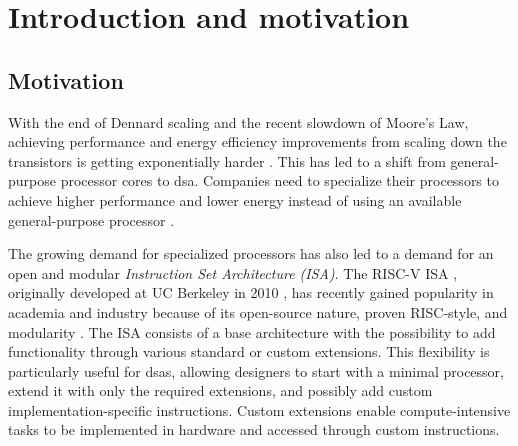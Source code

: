 
\chapter{Introduction and motivation}
\label{Introduction} 





\section{Motivation}


With the end of Dennard scaling and the recent slowdown of Moore's Law, achieving performance and energy efficiency improvements from scaling down the transistors is getting exponentially harder \cite{hennessyComputerArchitectureQuantitative2019}. This has led to a shift from general-purpose processor cores to \acrfull{dsa}. Companies need to specialize their processors to achieve higher performance and lower energy instead of using an available general-purpose processor \cite{mezgerSurveyRISCVArchitecture2022}. 


The growing demand for specialized processors has also led to a demand for an open and modular \textit{Instruction Set Architecture (ISA)}. The RISC-V ISA \cite{watermanRISCVInstructionSet2019,watermanRISCVInstructionSet2021}, originally developed at UC Berkeley in 2010 \cite{pattersonComputerOrganizationDesign2021}, has recently gained popularity in academia and industry because of its open-source nature, proven RISC-style, and modularity \cite{asanovicInstructionSetsShould2014}. The ISA consists of a base architecture with the possibility to add functionality through various standard or custom extensions\cite{watermanRISCVInstructionSet2019}. This flexibility is particularly useful for \acrshort{dsa}s, allowing designers to start with a minimal processor, extend it with only the required extensions, and possibly add custom implementation-specific instructions. Custom extensions enable compute-intensive tasks to be implemented in hardware and accessed through custom instructions. 

